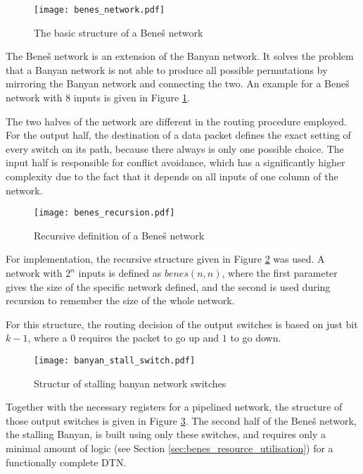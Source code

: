 \begin{figure}[!ht]
	\centering
	\texttt{[image: benes\_network.pdf]}
	\caption{The basic structure of a Beneš network}
	\label{fig:benes}
\end{figure}

The Beneš network is an extension of the Banyan network.
It solves the problem that a Banyan network is not able to produce all possible permutations by mirroring the Banyan network and connecting the two.
An example for a Beneš network with 8 inputs is given in Figure \ref{fig:benes}.

The two halves of the network are different in the routing procedure employed.
For the output half, the destination of a data packet defines the exact setting of every switch on its path, because there always is only one possible choice.
The input half is responsible for conflict avoidance, which has a significantly higher complexity due to the fact that it depends on all inputs of one column of the network.

\begin{figure}[!ht]
	\centering
	\texttt{[image: benes\_recursion.pdf]}
	\caption{Recursive definition of a Beneš network}
	\label{fig:benes_recursion}
\end{figure}

For implementation, the recursive structure given in Figure \ref{fig:benes_recursion} was used.
A network with $2^n$ inputs is defined as $benes(n, n)$, where the first parameter gives the size of the specific network defined, and the second is used during recursion to remember the size of the whole network.

For this structure, the routing decision of the output switches is based on just bit $k - 1$, where a $0$ requires the packet to go up and $1$ to go down.

\begin{figure}[!ht]
	\centering
	\texttt{[image: banyan\_stall\_switch.pdf]}
	\caption{Structur of stalling banyan network switches}
	\label{fig:banyan_stall_switch}
\end{figure}

Together with the necessary registers for a pipelined network, the structure of those output switches is given in Figure \ref{fig:banyan_stall_switch}.
The second half of the Beneš network, the stalling Banyan, is built using only these switches, and requires only a minimal amount of logic (see Section \ref{sec:benes_resource_utilisation}) for a functionally complete DTN.

